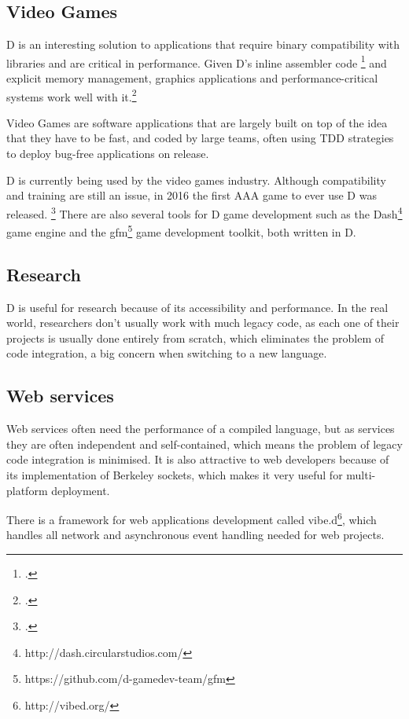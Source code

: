 \subsection{Video Games}

D is an interesting solution to applications that require binary compatibility with libraries and are critical in performance. Given D's inline assembler code \footcite{iasm} and explicit memory management, graphics applications and performance-critical systems work well with it.\footcite{areas_of_d_usage}

Video Games are software applications that are largely built on top of the idea that they have to be fast, and coded by large teams, often using TDD strategies to deploy bug-free applications on release.

D is currently being used by the video games industry. Although compatibility and training are still an issue, in 2016 the first AAA game to ever use D was released. \footcite{watson_ethan_d} There are also several tools for D game development such as the Dash\footnote{http://dash.circularstudios.com/} game engine and the gfm\footnote{https://github.com/d-gamedev-team/gfm} game development toolkit, both written in D.

\subsection{Research} \label{subsec:research}

D is useful for research because of its accessibility and performance. In the real world, researchers don't usually work with much legacy code, as each one of their projects is usually done entirely from scratch, which eliminates the problem of code integration, a big concern when switching to a new language.

\subsection{Web services} \label{subsec:web_services}

Web services often need the performance of a compiled language, but as services they are often independent and self-contained, which means the problem of legacy code integration is minimised. It is also attractive to web developers because of its implementation of Berkeley sockets, which makes it very useful for multi-platform deployment.

There is a framework for web applications development called vibe.d\footnote{http://vibed.org/}, which handles all network and asynchronous event handling needed for web projects.

